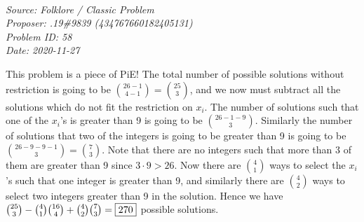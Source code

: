 \SSbreak\\
\emph{Source: Folklore / Classic Problem}\\
\emph{Proposer: .19\#9839 (434767660182405131)}\\
\emph{Problem ID: 58}\\
\emph{Date: 2020-11-27}\\
\SSbreak

\bigskip

\begin{solution}\hfil\medskip

    This problem is a piece of PiE! The total number of possible solutions without restriction is going to be \(\binom{26-1}{4-1}=\binom{25}{3}\), and we now must subtract all the solutions which do not fit the restriction on \(x_i\). 
    The number of solutions such that one of the \(x_i\)'s is greater than 9 is going to be \(\binom{26-1-9}{3}\). 
    Similarly the number of solutions that two of the integers is going to be greater than 9 is going to be \(\binom{26-9-9-1}{3}=\binom{7}{3}\). 
    Note that there are no integers such that more than 3 of them are greater than 9 since \(3\cdot9>26\). 
    Now there are \(\binom{4}{1}\) ways to select the \(x_i\)'s such that one integer is greater than 9, and similarly there are \(\binom{4}{2}\) ways to select two integers greater than 9 in the solution. Hence we have \(\binom{25}{3}-\binom{4}{1}\binom{16}{4}+\binom{4}{2}\binom{7}{3}=\fbox{270}\) possible solutions.
\end{solution}